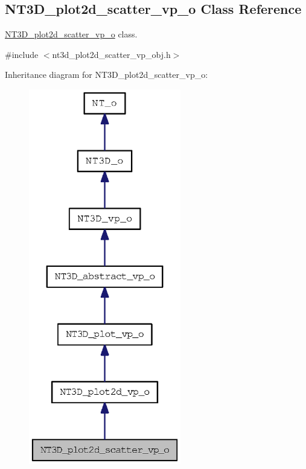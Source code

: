 \subsection{NT3D\_\-plot2d\_\-scatter\_\-vp\_\-o Class Reference}
\label{class_n_t3_d__plot2d__scatter__vp__o}


\hyperlink{class_n_t3_d__plot2d__scatter__vp__o}{NT3D\_\-plot2d\_\-scatter\_\-vp\_\-o} class.  




{\ttfamily \#include $<$nt3d\_\-plot2d\_\-scatter\_\-vp\_\-obj.h$>$}



Inheritance diagram for NT3D\_\-plot2d\_\-scatter\_\-vp\_\-o:
\nopagebreak
\begin{figure}[H]
\begin{center}
\leavevmode
\includegraphics[width=188pt]{class_n_t3_d__plot2d__scatter__vp__o__inherit__graph}
\end{center}
\end{figure}


